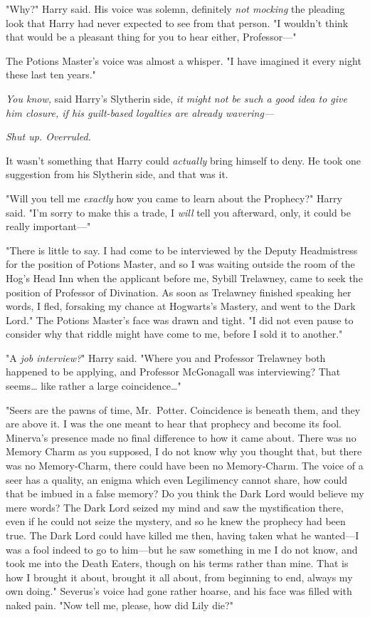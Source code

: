 "Why?" Harry said. His voice was solemn, definitely \emph{not mocking} the 
pleading look that Harry had never expected to see from that person. "I 
wouldn't think that would be a pleasant thing for you to hear either, 
Professor---"

The Potions Master's voice was almost a whisper. "I have imagined it every 
night these last ten years."

\emph{You know,} said Harry's Slytherin side, \emph{it might not be such a good 
idea to give him closure, if his guilt-based loyalties are already wavering---}

\emph{Shut up. Overruled.}

It wasn't something that Harry could \emph{actually} bring himself to deny. He 
took one suggestion from his Slytherin side, and that was it.

"Will you tell me \emph{exactly} how you came to learn about the Prophecy?" 
Harry said. "I'm sorry to make this a trade, I \emph{will} tell you afterward, 
only, it could be really important---"

"There is little to say. I had come to be interviewed by the Deputy 
Headmistress for the position of Potions Master, and so I was waiting outside 
the room of the Hog's Head Inn when the applicant before me, Sybill Trelawney, 
came to seek the position of Professor of Divination. As soon as Trelawney 
finished speaking her words, I fled, forsaking my chance at Hogwarts's Mastery, 
and went to the Dark Lord." The Potions Master's face was drawn and tight. "I 
did not even pause to consider why that riddle might have come to me, before I 
sold it to another."

"A \emph{job interview?}" Harry said. "Where you and Professor Trelawney both 
happened to be applying, and Professor McGonagall was interviewing? That 
seems{\ldots} like rather a large coincidence{\ldots}"

"Seers are the pawns of time, Mr.~Potter. Coincidence is beneath them, and they 
are above it. I was the one meant to hear that prophecy and become its fool. 
Minerva's presence made no final difference to how it came about. There was no 
Memory Charm as you supposed, I do not know why you thought that, but there was 
no Memory-Charm, there could have been no Memory-Charm. The voice of a seer has 
a quality, an enigma which even Legilimency cannot share, how could that be 
imbued in a false memory? Do you think the Dark Lord would believe my mere 
words? The Dark Lord seized my mind and saw the mystification there, even if he 
could not seize the mystery, and so he knew the prophecy had been true. The 
Dark Lord could have killed me then, having taken what he wanted---I was a fool 
indeed to go to him---but he saw something in me I do not know, and took me 
into the Death Eaters, though on his terms rather than mine. That is how I 
brought it about, brought it all about, from beginning to end, always my own 
doing." Severus's voice had gone rather hoarse, and his face was filled with 
naked pain. "Now tell me, please, how did Lily die?"

